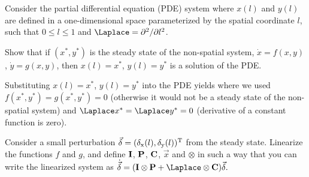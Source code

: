 

Consider the partial differential equation (PDE) system 
where $x(l)$ and $y(l)$ are defined in a one-dimensional space parameterized by the spatial coordinate $l$, such that $0\leq l \leq 1$ and $\Laplace=\partial^2/\partial l^2$. 

\subquestion 
Show that if $(x^*,y^*)$ is the steady state of the non-spatial system, $\dot{x}=f(x,y)$, $\dot{y}=g(x,y)$, then $x(l)=x^*$, $y(l)=y^*$ is a solution of the PDE. 

\solution 
Substituting $x(l)=x^*$, $y(l)=y^*$ into the PDE yields 
where we used $f(x^*,y^*)=g(x^*,y^*)=0$ (otherwise it would not be a steady state of the non-spatial system) and $\Laplace x^* = \Laplace y^* =0 $ (derivative of a constant function is zero). 

\subquestion 
Consider a small perturbation $\vec{\delta}=(\delta_{\rm x}(l),\delta_{\rm y}(l))^{\rm T}$ from the steady state.  
Linearize the functions $f$ and $g$, and define $\bf I$, $\bf P$, $\bf C$, $\vec{x}$ and $\otimes$ in such a way that you can write the linearized system as $\dot{\vec{\delta}}=({\bf I}\otimes{\bf P}+{\Laplace}\otimes {\bf C}) \vec{\delta}.$ 

